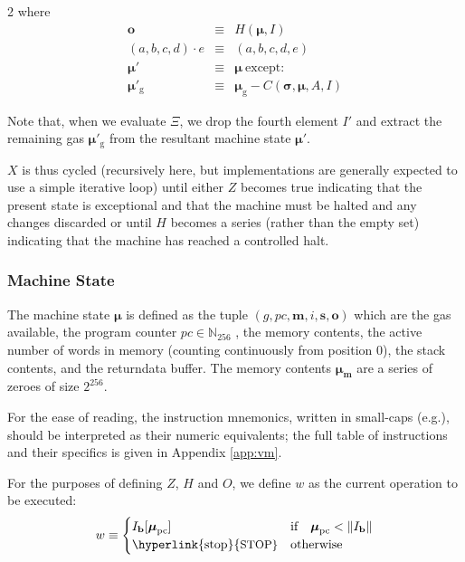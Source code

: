 \documentclass[9pt,oneside]{amsart}
\makeatletter
\newcommand*\eg{e.g.\@\xspace}
\makeatother
\begin{document}
\begin{multicols}{2}
where
\begin{eqnarray}
\mathbf{o} & \equiv & H(\boldsymbol{\mu}, I) \\
(a, b, c, d) \cdot e & \equiv & (a, b, c, d, e) \\
\boldsymbol{\mu}' & \equiv & \boldsymbol{\mu}\ \text{except:} \\
\boldsymbol{\mu}'_{\mathrm{g}} & \equiv & \boldsymbol{\mu}_{\mathrm{g}} - C(\boldsymbol{\sigma}, \boldsymbol{\mu}, A, I)
\end{eqnarray}

Note that, when we evaluate $\Xi$, we drop the fourth element $I'$ and extract the remaining gas $\boldsymbol{\mu}'_{\mathrm{g}}$ from the resultant machine state $\boldsymbol{\mu}'$.

$X$ is thus cycled (recursively here, but implementations are generally expected to use a simple iterative loop) until either \hyperlink{zhalt}{$Z$} becomes true indicating that the present state is exceptional and that the machine must be halted and any changes discarded or until \hyperlink{hhalt}{$H$} becomes a series (rather than the empty set) indicating that the machine has reached a controlled halt.

\subsubsection{Machine State}
The machine state $\boldsymbol{\mu}$ is defined as the tuple $(g, pc, \mathbf{m}, i, \mathbf{s}, \mathbf{o})$ which are the gas available, the program counter $pc \in \mathbb{N}_{256}$ , the memory contents, the active number of words in memory (counting continuously from position 0), the stack contents, and the returndata buffer. The memory contents $\boldsymbol{\mu}_{\mathbf{m}}$ are a series of zeroes of size $2^{256}$.

For the ease of reading, the instruction mnemonics, written in small-caps (\eg {}), should be interpreted as their numeric equivalents; the full table of instructions and their specifics is given in Appendix \ref{app:vm}.

For the purposes of defining $Z$, $H$ and $O$, we define $w$ as the current operation to be executed:
\begin{equation}\label{eq:currentoperation}
w \equiv \begin{cases} I_{\mathbf{b}}[\boldsymbol{\mu}_{\mathrm{pc}}] & \text{if} \quad \boldsymbol{\mu}_{\mathrm{pc}} < \lVert I_{\mathbf{b}} \rVert \\
\text{\hyperlink{stop}{\small STOP}} & \text{otherwise}
\end{cases}
\end{equation}


\end{multicols}
\end{document}
